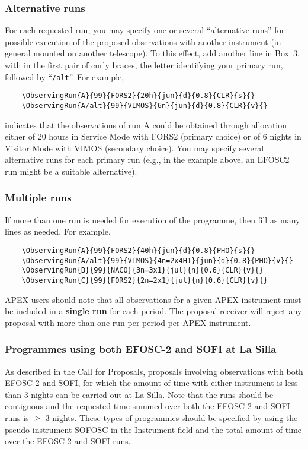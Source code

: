 \documentclass{article}
\begin{document}
\subsubsection*{Alternative runs}
For each requested run, you may specify one or several
``alternative runs'' for possible execution of the proposed
observations with another instrument (in general mounted on another
telescope). To this effect, add another line in Box~3, with in the
first pair of curly braces, the letter identifying your primary run,
followed by ``\verb|/alt|''. For example,
\begin{verbatim}
    \ObservingRun{A}{99}{FORS2}{20h}{jun}{d}{0.8}{CLR}{s}{}
    \ObservingRun{A/alt}{99}{VIMOS}{6n}{jun}{d}{0.8}{CLR}{v}{}
\end{verbatim}
indicates that the observations of run A could be obtained
through allocation either of 20 hours in Service Mode with FORS2
(primary choice) or of 6 nights in Visitor Mode with VIMOS (secondary
choice). You may specify several alternative runs for each primary run
(e.g., in the example above, an EFOSC2 run might be a suitable alternative).

\subsubsection*{Multiple runs}
If more than one run is needed for execution of
the programme, then fill as many lines as needed.  For example,
\begin{verbatim} 
    \ObservingRun{A}{99}{FORS2}{40h}{jun}{d}{0.8}{PHO}{s}{}
    \ObservingRun{A/alt}{99}{VIMOS}{4n=2x4H1}{jun}{d}{0.8}{PHO}{v}{}
    \ObservingRun{B}{99}{NACO}{3n=3x1}{jul}{n}{0.6}{CLR}{v}{}
    \ObservingRun{C}{99}{FORS2}{2n=2x1}{jul}{n}{0.6}{CLR}{v}{}
\end{verbatim}

APEX users should note that all observations for a given APEX
instrument must be included in a {\bf single run} for each period. The proposal
receiver 
will reject any proposal with more than one run per period per APEX instrument. 

\subsubsection*{Programmes using both EFOSC-2 and SOFI at La Silla}
\label{sec:sofiefosc}

As described in the Call for Proposals,
proposals involving observations with both EFOSC-2 and SOFI,
for which the amount of time with either instrument is less than
3 nights can be carried out at La Silla.
Note that the runs should be contiguous and the requested time
summed over both the EFOSC-2 and SOFI runs is $\ge$ 3 nights.
These types of programmes should be specified
by using the pseudo-instrument SOFOSC in the Instrument field and
the total amount of time over the EFOSC-2 and SOFI runs.
\end{document}
